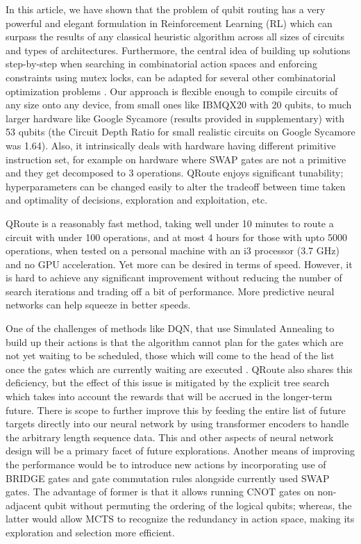 In this article, we have shown that the problem of qubit routing has a very powerful and elegant formulation in Reinforcement Learning (RL) which can surpass the results of any classical heuristic algorithm across all sizes of circuits and types of architectures. Furthermore, the central idea of building up solutions step-by-step when searching in combinatorial action spaces and enforcing constraints using mutex locks, can be adapted for several other combinatorial optimization problems \cite{comb_survey, comb_1, comb_2, comb_3, comb_4}. Our approach is flexible enough to compile circuits of any size onto any device, from small ones like IBMQX20 with 20 qubits, to much larger hardware like Google Sycamore (results provided in supplementary) with 53 qubits (the Circuit Depth Ratio for small realistic circuits on Google Sycamore was 1.64). Also, it intrinsically deals with hardware having different primitive instruction set, for example on hardware where SWAP gates are not a primitive and they get decomposed to 3 operations. QRoute enjoys significant tunability; hyperparameters can be changed easily to alter the tradeoff between time taken and optimality of decisions, exploration and exploitation, etc.

QRoute is a reasonably fast method, taking well under 10 minutes to route a circuit with under 100 operations, and at most 4 hours for those with upto 5000 operations, when tested on a personal machine with an i3 processor (3.7 GHz) and no GPU acceleration. Yet more can be desired in terms of speed. However, it is hard to achieve any significant improvement without reducing the number of search iterations and trading off a bit of performance. More predictive neural networks can help squeeze in better speeds.

One of the challenges of methods like DQN, that use Simulated Annealing to build up their actions is that the algorithm cannot plan for the gates which are not yet waiting to be scheduled, those which will come to the head of the list once the gates which are currently waiting are executed \cite{qroute_dqn2}. QRoute also shares this deficiency, but the effect of this issue is mitigated by the explicit tree search which takes into account the rewards that will be accrued in the longer-term future. There is scope to further improve this by feeding the entire list of future targets directly into our neural network by using transformer encoders to handle the arbitrary length sequence data. This and other aspects of neural network design will be a primary facet of future explorations. Another means of improving the performance  would be to introduce new actions by incorporating use of BRIDGE gates \cite{bridge_gate} and gate commutation rules \cite{utk_equiv_circuits} alongside currently used SWAP gates. The advantage of former is that it allows running CNOT gates on non-adjacent qubit without permuting the ordering of the logical qubits; whereas, the latter would allow MCTS to recognize the redundancy in action space, making its exploration and selection more efficient.

